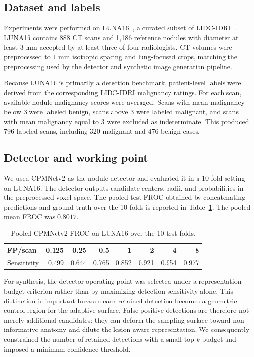 \documentclass[preprint,12pt]{elsarticle}
\begin{document}
\subsection{Dataset and labels}

Experiments were performed on LUNA16~\cite{setio2017luna16}, a curated subset of LIDC-IDRI~\cite{armato2011lidc}. LUNA16 contains 888 CT scans and 1,186 reference nodules with diameter at least 3 mm accepted by at least three of four radiologists. CT volumes were preprocessed to 1 mm isotropic spacing and lung-focused crops, matching the preprocessing used by the detector and synthetic image generation pipeline.

Because LUNA16 is primarily a detection benchmark, patient-level labels were derived from the corresponding LIDC-IDRI malignancy ratings. For each scan, available nodule malignancy scores were averaged. Scans with mean malignancy below 3 were labeled benign, scans above 3 were labeled malignant, and scans with mean malignancy equal to 3 were excluded as indeterminate. This produced 796 labeled scans, including 320 malignant and 476 benign cases.

\subsection{Detector and working point}

We used CPMNetv2 as the nodule detector and evaluated it in a 10-fold setting on LUNA16. The detector outputs candidate centers, radii, and probabilities in the preprocessed voxel space. The pooled test FROC obtained by concatenating predictions and ground truth over the 10 folds is reported in Table~\ref{tab:detector_froc}. The pooled mean FROC was $0.8017$.

\begin{table}[t]
\centering
\caption{Pooled CPMNetv2 FROC on LUNA16 over the 10 test folds.}
\label{tab:detector_froc}
\begin{tabular}{lrrrrrrr}
\toprule
FP/scan & 0.125 & 0.25 & 0.5 & 1 & 2 & 4 & 8 \\
\midrule
Sensitivity & 0.499 & 0.644 & 0.765 & 0.852 & 0.921 & 0.954 & 0.977 \\
\bottomrule
\end{tabular}
\end{table}

For synthesis, the detector operating point was selected under a representation-budget criterion rather than by maximizing detection sensitivity alone. This distinction is important because each retained detection becomes a geometric control region for the adaptive surface. False-positive detections are therefore not merely additional candidates: they can deform the sampling surface toward non-informative anatomy and dilute the lesion-aware representation. We consequently constrained the number of retained detections with a small top-$k$ budget and imposed a minimum confidence threshold.
\end{document}
